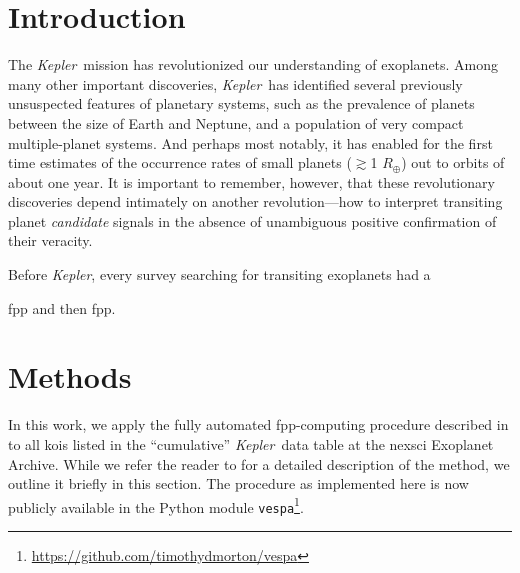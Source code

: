 \documentclass[preprint2]{aastex}
\newcommand{\kepler}{\textit{Kepler}}
\newcommand{\vespa}{\texttt{vespa}}
\begin{document}

\keywords{}


\section{Introduction}

The \kepler\ mission has revolutionized our understanding of
exoplanets.  Among many other important discoveries, \kepler\ has
identified several previously unsuspected features of planetary
systems, such as the prevalence of planets between the size of Earth
and Neptune, and a population of very compact multiple-planet
systems. And perhaps most notably, it has enabled for the first time
estimates of the occurrence rates of small planets ($\gtrsim$1
$R_\oplus$) out to orbits of about one year.  It is important to
remember, however, that these revolutionary discoveries depend
intimately on another revolution---how to interpret transiting planet
\textit{candidate} signals in the absence of unambiguous positive
confirmation of their veracity.

Before \kepler, every survey searching for transiting exoplanets had a 

\ac{fpp} and then \ac{fpp}.


\section{Methods}
\label{sec:methods}

In this work, we apply the fully automated \ac{fpp}-computing
procedure described in \citet[][hereafter
  ]{Morton:2012} to all \acp{koi} listed in
the ``cumulative'' \kepler\ data table at the \ac{nexsci} Exoplanet
Archive.  While we refer the reader to  for a
detailed description of the method, we outline it briefly in this
section.  The procedure as implemented here is now publicly available
in the Python module
\vespa\footnote{\url{https://github.com/timothydmorton/vespa}}.
\end{document}
